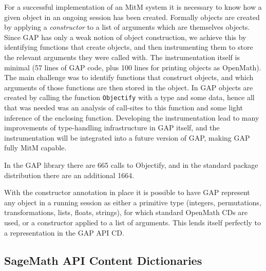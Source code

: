 For a successful implementation of an MitM system it is necessary to know how
a given object in an ongoing session has been created. Formally objects are
created by applying a \emph{constructor} to a list of arguments which are
themselves objects.
Since GAP has only a weak notion of object construction, we achieve this by
identifying functions that create objects, and then instrumenting them to store
the relevant arguments they were called with.
The instrumentation itself is minimal (57 lines of GAP code, plus 100 lines for
printing objects as OpenMath). The main challenge was
to identify functions that construct objects, and which arguments of those
functions are then stored in the object.
In GAP objects are created by calling the function \texttt{Objectify} with a
type and some data, hence all that was needed was an analysis of call-sites to
this function and some light inference of the enclosing function.
Developing the instrumentation lead to many improvements of type-handling
infrastructure in GAP itself, and the instrumentation will be integrated into a
future version of GAP, making GAP fully MitM capable.

In the GAP library there are 665 calls to Objectify, and in the standard package
distribution there are an additional 1664.

With the constructor annotation in place it is possible to have GAP represent
any object in a running session as either a primitive type (integers,
permutations, transformations, lists, floats, strings), for which standard
OpenMath CDs are used, or a constructor applied to a list of arguments. This
lends itself perfectly to a representation in the GAP API CD.



\subsection{SageMath API Content Dictionaries}

